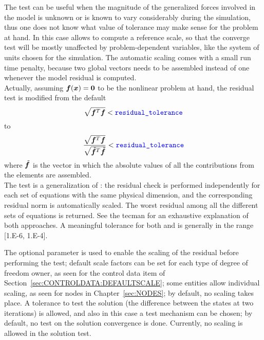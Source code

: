 The  test can be useful when the magnitude of the
generalized forces involved in the model is unknown or is known to vary
considerably during the simulation, thus one does not know what value 
of tolerance may make sense for the problem at hand.
In this case  allows to compute a reference scale, so that the
converge test will be mostly unaffected by problem-dependent variables, 
like the system of units chosen for the simulation. 
The automatic scaling comes with a small run time penalty, because two global vectors
needs to be assembled instead of one whenever the model residual is computed.\\
Actually, assuming $\boldsymbol{f}(\boldsymbol{x}) = \boldsymbol{0}$ to be the nonlinear problem at hand, 
the residual test is modified from the default
\begin{equation}
  \sqrt{\boldsymbol{f}^{T}\boldsymbol{f}} < \text{\textcolor{blue}{\texttt{residual\_tolerance}}} 
\end{equation}
to
\begin{equation}
  \dfrac{\sqrt{\boldsymbol{f}^{T}\boldsymbol{f}}}{\sqrt{\tilde{\boldsymbol{f}}^{T}\tilde{\boldsymbol{f}}}}
  < \text{\textcolor{blue}{\texttt{residual\_tolerance}}}
\end{equation}
where $\tilde{\boldsymbol{f}}$ is the vector in which the absolute values of all the contributions
from the elements are assembled.\\
The  test is a generalization of : the residual check is performed 
independently for each set of equations with the same physical dimension, and the
corresponding residual norm
is automatically scaled. The worst residual among all the different sets of equations is returned.
See the tecman for an exhaustive explanation of both approaches.
A meaningful tolerance for both  and  is generally in the range [1.E-6, 1.E-4].

The optional parameter  is used to enable the scaling
of the residual before performing the test; default scale factors 
can be set for each type of degree of freedom owner, as seen for the control data item of Section~\ref{sec:CONTROLDATA:DEFAULTSCALE}; some
entities allow individual scaling, as seen for nodes in Chapter~\ref{sec:NODES}; by default, no scaling takes place.
A tolerance  to test the solution 
(the difference between the states at two iterations) is allowed, 
and also in this case a test mechanism can be chosen;
by default, no test on the solution convergence is done.
Currently, no scaling is allowed in the solution test.

\noindent
